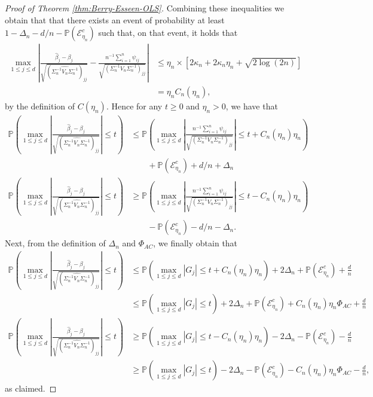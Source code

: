\documentclass[11pt]{article}
\begin{document}
\begin{appendices}
\begin{proof}[Proof of Theorem \ref{thm:Berry-Esseen-OLS}]
Combining  these inequalities we obtain  that that there exists an event of probability at least $1 - \Delta_n - d/n - \mathbb{P}(\mathcal{E}_{\eta_n}^c)$ such that, on that event, it holds that 
\begin{align*}
\max_{1\le j\le d}\left|\frac{\widehat{\beta}_j - \beta_j}{\sqrt{(\widehat{\Sigma_n^{-1}V_n\Sigma_n^{-1}})_{jj}}} - \frac{n^{-1}\sum_{i=1}^n \psi_{ij}}{\sqrt{(\Sigma_n^{-1}V_n\Sigma_n^{-1})_{jj}}}\right| & \leq  \eta_n\times \left[ 2\kappa_n + 2\kappa_n \eta_n + \sqrt{2\log(2n)} \right]\\
& = \eta_n C_n(\eta_n),
\end{align*}
by the definition of $C(\eta_n)$.
 Hence for any $t \ge 0$ and $\eta_n > 0$, we have that
\begin{align*}
\mathbb{P}\left(\max_{1\le j\le d}\left|\frac{\widehat{\beta}_j - \beta_j}{\sqrt{(\widehat{\Sigma_n^{-1}V_n\Sigma_n^{-1}})_{jj}}}\right| \le t\right) &\le \mathbb{P}\left(\max_{1\le j\le d}\left|\frac{n^{-1}\sum_{i=1}^n \psi_{ij}}{\sqrt{(\Sigma_n^{-1}V_n\Sigma_n^{-1})_{jj}}}\right| \le t + C_n(\eta_n)\eta_n\right)\\ &\qquad+ \mathbb{P}(\mathcal{E}_{\eta_n}^c) + d/n + \Delta_n\\
\mathbb{P}\left(\max_{1\le j\le d}\left|\frac{\widehat{\beta}_j - \beta_j}{\sqrt{(\widehat{\Sigma_n^{-1}V_n\Sigma_n^{-1}})_{jj}}}\right| \le t\right) &\ge \mathbb{P}\left(\max_{1\le j\le d}\left|\frac{n^{-1}\sum_{i=1}^n \psi_{ij}}{\sqrt{(\Sigma_n^{-1}V_n\Sigma_n^{-1})_{jj}}}\right| \le t - C_n(\eta_n)\eta_n\right)\\ &\qquad- \mathbb{P}(\mathcal{E}_{\eta_n}^c) - d/n - \Delta_n.
\end{align*}
Next, from the definition of $\Delta_n$ and $\Phi_{AC}$, we finally obtain that
\begin{align*}
\mathbb{P}\left(\max_{1\le j\le d}\left|\frac{\widehat{\beta}_j - \beta_j}{\sqrt{(\widehat{\Sigma_n^{-1}V_n\Sigma_n^{-1}})_{jj}}}\right| \le t\right) &\le \mathbb{P}\left(\max_{1\le j\le d}|G_j| \le t + C_n(\eta_n)\eta_n\right) + 2\Delta_n + \mathbb{P}(\mathcal{E}_{\eta_n}^c) + \frac{d}{n}\\
&\le \mathbb{P}\left(\max_{1\le j\le d}|G_j| \le t\right) + 2\Delta_n + \mathbb{P}(\mathcal{E}_{\eta_n}^c) + C_n(\eta_n)\eta_n \Phi_{AC} + \frac{d}{n}\\
\mathbb{P}\left(\max_{1\le j\le d}\left|\frac{\widehat{\beta}_j - \beta_j}{\sqrt{(\widehat{\Sigma_n^{-1}V_n\Sigma_n^{-1}})_{jj}}}\right| \le t\right) &\ge \mathbb{P}\left(\max_{1\le j\le d}|G_j| \le t - C_n(\eta_n)\eta_n\right) - 2\Delta_n - \mathbb{P}(\mathcal{E}_{\eta_n}^c) - \frac{d}{n}\\
&\ge \mathbb{P}\left(\max_{1\le j\le d}|G_j| \le t\right) - 2\Delta_n - \mathbb{P}(\mathcal{E}_{\eta_n}^c) - C_n(\eta_n)\eta_n \Phi_{AC} - \frac{d}{n},
\end{align*}
as claimed.
\end{proof}




\end{appendices}
\end{document}
